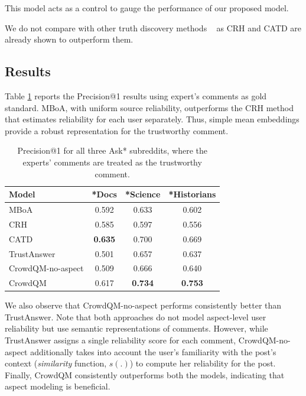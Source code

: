This model acts as a control to gauge the performance of our proposed model.

We do not compare with other truth discovery methods ~\cite{Zhao:2012, Yin:2007, Pasternack:2011, Galland:2010, Dong:2009} as CRH and CATD are already shown to outperform them.

\subsection{Results}\label{Results}
Table \ref{tab:pred} reports the Precision@1 results using expert's comments as gold standard.
MBoA, with uniform source reliability, outperforms the CRH method that estimates reliability for each user separately. Thus, simple mean embeddings provide a robust representation for the trustworthy comment.
\begin{table}[tbh]
  \centering
\begin{tabular}{ l | c c c }
\toprule %
 Model &  *Docs & *Science & *Historians \\
  \midrule
 MBoA             & 0.592 & 0.633 & 0.602 \\
 CRH                                     & 0.585 & 0.597 & 0.556 \\
 CATD                                 & \textbf{0.635} & 0.700 & 0.669 \\
 TrustAnswer                     & 0.501 & 0.657 & 0.637 \\
 CrowdQM-no-aspect                           & 0.509 & 0.666 & 0.640 \\
 CrowdQM            & 0.617 & \textbf{0.734} & \textbf{0.753} \\
 \bottomrule
\end{tabular}
\caption{\label{tab:pred} Precision@1 for all three Ask* subreddits, where the experts' comments are treated as the trustworthy comment. }
\end{table}

We also observe that CrowdQM-no-aspect performs consistently better than TrustAnswer. Note that both approaches do not model aspect-level user reliability but use semantic representations of comments. However, while TrustAnswer assigns a single reliability score for each comment, CrowdQM-no-aspect additionally takes into account the user's familiarity with the post's context (\emph{similarity} function, $s(.)$)
to compute her reliability for the post.
Finally, CrowdQM consistently outperforms both the models, indicating that aspect modeling is beneficial.

